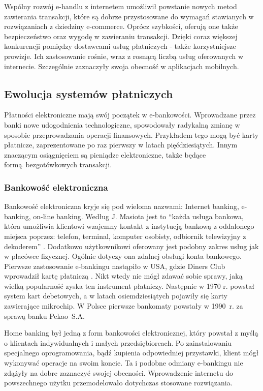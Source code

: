 Wspólny rozwój e-handlu z internetem umożliwił powstanie nowych metod 
zawierania transakcji, które są dobrze przystosowane do wymagań 
stawianych w rozwiązaniach z dziedziny e-commerce. Oprócz szybkości, oferują 
one także bezpieczeństwo oraz wygodę w zawieraniu transakcji. Dzięki coraz 
większej konkurencji pomiędzy dostawcami usług płatniczych - także 
korzystniejsze prowizje. Ich zastosowanie rośnie, wraz z rosnącą liczbą usług 
oferowanych w internecie. Szczególnie zaznaczyły swoja obecność w aplikacjach 
mobilnych.

\subsection{Ewolucja systemów płatniczych}

Płatności elektroniczne mają swój początek w e-bankowości. Wprowadzane przez 
banki nowe udogodnienia technologiczne, 
spowodowały radykalną zmianę w sposobie przeprowadzania operacji finansowych. 
Przykładem tego mogą być karty płatnicze, zaprezentowane po raz pierwszy w 
latach pięćdziesiątych. Innym znaczącym osiągnięciem są pieniądze 
elektroniczne, także będące formą bezgotówkowych transakcji. 

\subsubsection*{Bankowość elektroniczna}

Bankowość elektroniczna kryje się pod wieloma nazwami: Internet banking, 
e-banking, on-line banking. Według J. Masiota jest to ``każda usługa bankowa, 
która umożliwia klientowi wzajemny kontakt z instytucją bankową z oddalonego 
miejsca poprzez: telefon, terminal, komputer osobisty, odbiornik telewizyjny z 
dekoderem'' \cite{pieniadz_elektroniczny-analiza}. Dodatkowo użytkownikowi 
oferowany jest podobny zakres usług jak w placówce fizycznej. Ogólnie dotyczy 
ona zdalnej obsługi konta bankowego. Pierwsze zastosowanie e-bankingu nastąpiło 
w USA, gdzie Diners Club wprowadził kartę płatniczą 
\cite{pieniadz_elektroniczny-analiza}. Nikt wtedy nie mógł zdawać sobie sprawy, 
jaką wielką popularność zyska ten instrument płatniczy. Następnie w 1970 r. 
powstał system kart debetowych, a w latach osiemdziesiątych pojawiły się  karty 
zawierające mikrochip. W Polsce pierwsze bankomaty powstały w 1990~r. za sprawą 
banku Pekao~S.A.

Home banking był jedną z form bankowości elektronicznej, który powstał z myślą 
o klientach indywidualnych i małych przedsiębiorcach. Po zainstalowaniu 
specjalnego oprogramowania, bądź kupienia odpowiedniej przystawki, klient mógł 
wykonywać operacje na swoim koncie. Ta i podobne odmiany e-bankingu nie zdążyły 
na dobre zaznaczyć swojej obecności. Wprowadzenie internetu do powszechnego 
użytku przemodelowało dotychczas stosowane rozwiązania.

